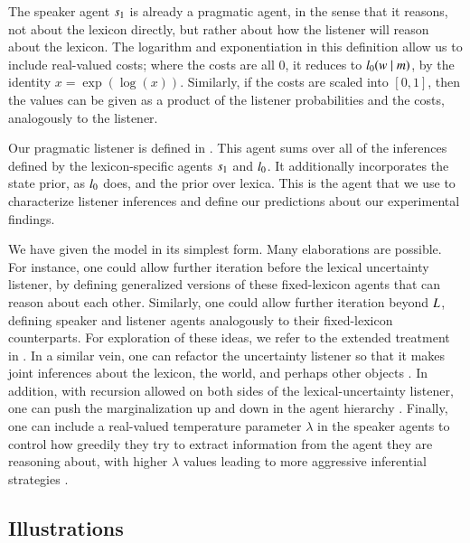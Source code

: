 \documentclass[leqno,12pt]{article}
\begin{document}
The speaker agent $s_{1}$ is already a pragmatic agent, in the
sense that it reasons, not about the lexicon directly, but rather
about how the listener will reason about the lexicon. The logarithm
and exponentiation in this definition allow us to include real-valued
costs; where the costs are all $0$, it reduces to
$l_{0}(w \mid m)$, by the identity $x =
\exp(\log(x))$.  Similarly, if the costs are scaled into $[0,1]$, then
the values can be given as a product of the listener probabilities and
the costs, analogously to the listener.

Our pragmatic listener is defined in . This agent
sums over all of the inferences defined by the lexicon-specific agents
$s_{1}$ and $l_{0}$. It additionally incorporates the
state prior, as $l_{0}$ does, and the prior over lexica.  This
is the agent that we use to characterize listener inferences and
define our predictions about our experimental findings.

We have given the model in its simplest form. Many elaborations are
possible. For instance, one could allow further iteration before the
lexical uncertainty listener, by defining generalized versions of
these fixed-lexicon agents that can reason about each
other. Similarly, one could allow further iteration beyond
$L$, defining speaker and listener agents
analogously to their fixed-lexicon counterparts.  For exploration of
these ideas, we refer to the extended treatment in
\citealt{Bergen:Levy:Goodman:2014}. In a similar vein, one can
refactor the uncertainty listener so that it makes joint inferences
about the lexicon, the world, and perhaps other objects
\citep{Smith:Goodman:Frank:2013, Kao-etal:2014}. In addition, with
recursion allowed on both sides of the lexical-uncertainty listener,
one can push the marginalization up and down in the agent hierarchy
\citep{Goodman:Lassiter:2013}. Finally, one can include a real-valued
temperature parameter $\lambda$ in the speaker agents to control how
greedily they try to extract information from the agent they are
reasoning about, with higher $\lambda$ values leading to more
aggressive inferential strategies
\citep{Sutton:Barto:1998,Bergen:Levy:Goodman:2014}.


\subsection{Illustrations}\label{sec:illustrations}
\end{document}
